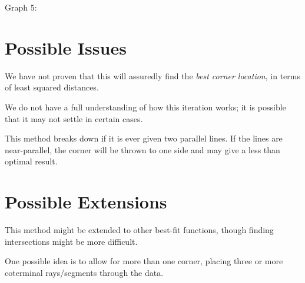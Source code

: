\documentclass[11pt]{article}
\begin{document}
Graph 5:
\begin{center}
\end{center}

\section*{Possible Issues}

We have not proven that this will assuredly find the \emph{best corner location}, in terms of least squared distances. 

We do not have a full understanding of how this iteration works; it is possible that it may not settle in certain cases.

This method breaks down if it is ever given two parallel lines. If the lines are near-parallel, the corner will be thrown to one side and may give a less than optimal result. 

\section*{Possible Extensions}

This method might be extended to other best-fit functions, though finding intersections might be more difficult.

One possible idea is to allow for more than one corner, placing three or more coterminal rays/segments through the data.
\end{document}
